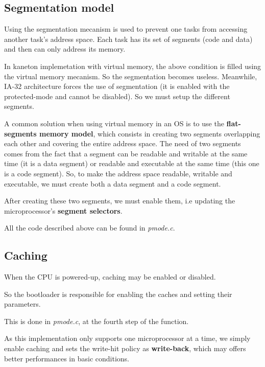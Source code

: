 %
%

\subsection{Segmentation model}

Using the segmentation mecanism is used to prevent one tasks from
accessing another task's address space. Each task has its set of
segments (code and data) and then can only address its memory.

In kaneton implemetation with virtual memory, the above condition is
filled using the virtual memory mecanism. So the segmentation becomes
useless. Meanwhile, IA-32 architecture forces the use of segmentation
(it is enabled with the protected-mode and cannot be disabled). So we
must setup the different segments.

A common solution when using virtual memory in an OS is to use the
\textbf{flat-segments memory model}, which consists in creating two
segments overlapping each other and covering the entire address
space. The need of two segments comes from the fact that a segment can
be readable and writable at the same time (it is a data segment) or
readable and executable at the same time (this one is a code
segment). So, to make the address space readable, writable and
executable, we must create both a data segment and a code segment.

After creating these two segments, we must enable them, i.e updating
the microprocessor's \textbf{segment selectors}.

All the code described above can be found in \textit{pmode.c}.

%
%

\subsection{Caching}

When the CPU is powered-up, caching may be enabled or disabled.

So the bootloader is responsible for enabling the caches and setting
their parameters.

This is done in \textit{pmode.c}, at the fourth step of the function.

As this implementation only supports one microprocessor at a time, we
simply enable caching and sets the write-hit policy as
\textbf{write-back}, which may offers better performances in basic
conditions.

%
%

